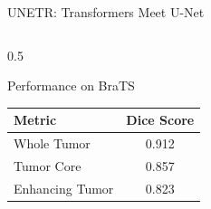 \documentclass[aspectratio=169]{beamer}
\begin{document}
\begin{frame}{UNETR: Transformers Meet U-Net}
\begin{columns}
\begin{column}{0.5\textwidth}
            \begin{block}{Performance on BraTS}
                \begin{center}
                    \begin{tabular}{lc}
                        \toprule
                        \textbf{Metric} & \textbf{Dice Score} \\
                        \midrule
                        Whole Tumor & 0.912 \\
                        Tumor Core & 0.857 \\
                        Enhancing Tumor & 0.823 \\
                        \bottomrule
                    \end{tabular}
                \end{center}
            \end{block}
        \end{column}
    \end{columns}
\end{frame}
\end{document}
